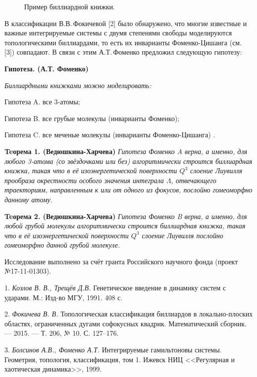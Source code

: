 \begin{figure}[h!]
	\caption{Пример биллиардной книжки. \label{3obl}}
\end{figure}

В классификации В.В.\,Фокичевой [2]  было обнаружено, что многие известные и важные интегрируемые системы с двумя степенями свободы моделируются топологическими  биллиардами, то есть их инварианты Фоменко-Цишанга (см. [3]) совпадают. В связи с этим А.Т.\,Фоменко предложил следующую гипотезу:

\textbf{Гипотеза. (А.Т. Фоменко)}
{\it Биллиардными книжками можно моделировать:

	Гипотеза A. все 3-атомы;

	Гипотеза B. все грубые молекулы (инварианты Фоменко);

	Гипотеза C. все меченые молекулы (инварианты Фоменко-Цишанга) .
}

\textbf{Teорема 1. (Ведюшкина-Харчева)}  {\it Гипотеза Фоменко A верна, а именно, для любого 3-атома (со звёздочками или без) алгоритмически строится биллиардная книжка, такая что в её изоэнергетической поверхности $ Q^3 $ слоение Лиувилля прообраза окрестности особого значения интеграла $ \Lambda $, отвечающего траекториям, направленным к или от одного из фокусов, послойно гомеоморфно данному атому.}

\textbf{Teорема 2. (Ведюшкина-Харчева)}  {\it Гипотеза Фоменко B верна, а именно, для любой грубой молекулы алгоритмически строится биллиардная книжка, такая что в её изоэнергетической поверхности $ Q^3 $ слоение Лиувилля послойно гомеоморфно данной грубой молекуле.}

\vspace{\baselineskip}
Исследование выполнено за счёт гранта Российского научного фонда (проект №17-11-01303).

\litlist

1. {\it  Козлов В. В., Трещёв Д.В.} Генетическое введение в динамику систем с ударами. М.:  Изд-во МГУ, 1991. 408 с.

2. {\it Фокичева В. В.} Топологическая классификация биллиардов в локально-плоских областях, ограниченных дугами софокусных квадрик. Математический сборник. — 2015. — Т. 206, № 10. С. 127–176.

3. {\it Болсинов А.В., Фоменко А.Т.} Интегрируемые гамильтоновы системы. Геометрия, топология, классификация, том 1. Ижевск НИЦ <<Регулярная и хаотическая динамика>>, 1999.
